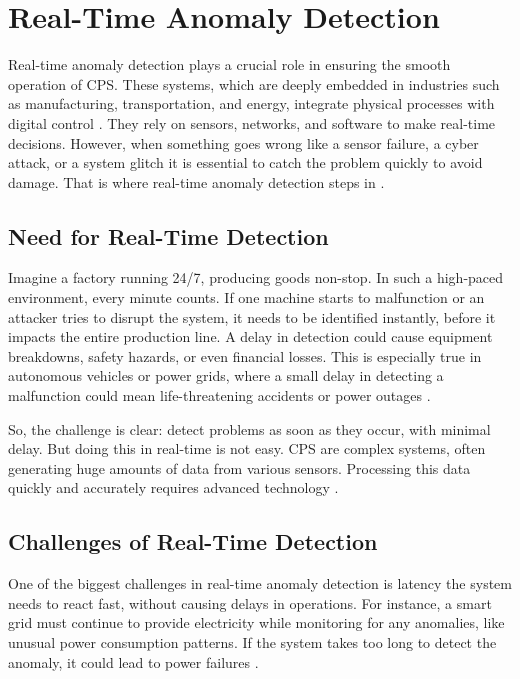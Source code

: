 \section{Real-Time Anomaly Detection}\label{sec:realtime}

Real-time anomaly detection plays a crucial role in ensuring the smooth operation of CPS. These systems, which are deeply embedded in industries such as manufacturing, transportation, and energy, integrate physical processes with digital control \cite{194,195,196,197}. They rely on sensors, networks, and software to make real-time decisions. However, when something goes wrong like a sensor failure, a cyber attack, or a system glitch it is essential to catch the problem quickly to avoid damage. That is where real-time anomaly detection steps in \cite{198,199,200}.

\subsection{Need for Real-Time Detection}

Imagine a factory running 24/7, producing goods non-stop. In such a high-paced environment, every minute counts. If one machine starts to malfunction or an attacker tries to disrupt the system, it needs to be identified instantly, before it impacts the entire production line. A delay in detection could cause equipment breakdowns, safety hazards, or even financial losses. This is especially true in autonomous vehicles or power grids, where a small delay in detecting a malfunction could mean life-threatening accidents or power outages \cite{98,99}.

So, the challenge is clear: detect problems as soon as they occur, with minimal delay. But doing this in real-time is not easy. CPS are complex systems, often generating huge amounts of data from various sensors. Processing this data quickly and accurately requires advanced technology \cite{101,60}.

\subsection{Challenges of Real-Time Detection}

One of the biggest challenges in real-time anomaly detection is latency the system needs to react fast, without causing delays in operations. For instance, a smart grid must continue to provide electricity while monitoring for any anomalies, like unusual power consumption patterns. If the system takes too long to detect the anomaly, it could lead to power failures \cite{50}.

